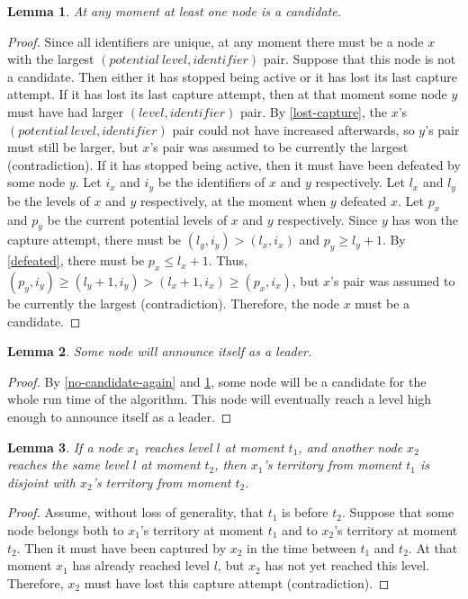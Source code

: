 \documentclass[a4paper,12pt]{article}
\newtheorem{lemma}{Lemma}
\newcommand{\midentifier}{\mathit{identifier}}
\newcommand{\mlevel}{\mathit{level}}
\newcommand{\mpotentiallevel}{\mathit{potential \ level}}
\begin{document}
\begin{lemma}\label{always-one-candidate}
    At any moment at least one node is a candidate.
\end{lemma}
\begin{proof}
    Since all identifiers are unique,
    at any moment there must be a node $x$ with the largest $(\mpotentiallevel, \midentifier)$ pair.
    Suppose that this node is not a candidate.
    Then either it has stopped being active or it has lost its last capture attempt.
    If it has lost its last capture attempt,
    then at that moment some node $y$ must have had larger $(\mlevel, \midentifier)$ pair.
    By \cref{lost-capture}, the $x$'s $(\mpotentiallevel, \midentifier)$ pair
    could not have increased afterwards, so $y$'s pair must still be larger,
    but $x$'s pair was assumed to be currently the largest (contradiction).
    If it has stopped being active, then it must have been defeated by some node $y$.
    Let $i_x$ and $i_y$ be the identifiers of $x$ and $y$ respectively.
    Let $l_x$ and $l_y$ be the levels of $x$ and $y$ respectively, at the moment when $y$ defeated $x$.
    Let $p_x$ and $p_y$ be the current potential levels of $x$ and $y$ respectively.
    Since $y$ has won the capture attempt, there must be $(l_y, i_y) > (l_x, i_x)$ and $p_y \geq l_y + 1$.
    By \cref{defeated}, there must be $p_x \leq l_x + 1$.
    Thus, $(p_y, i_y) \geq (l_y + 1, i_y) > (l_x + 1, i_x) \geq (p_x, i_x)$,
    but $x$'s pair was assumed to be currently the largest (contradiction).
    Therefore, the node $x$ must be a candidate.
\end{proof}

\begin{lemma}\label{min-one-leader}
    Some node will announce itself as a leader.
\end{lemma}
\begin{proof}
    By \cref{no-candidate-again} and \cref{always-one-candidate},
    some node will be a candidate for the whole run time of the algorithm.
    This node will eventually reach a level high enough to announce itself as a leader.
\end{proof}

\begin{lemma}\label{disjoint-territories}
    If a node $x_1$ reaches level $l$ at moment $t_1$,
    and another node $x_2$ reaches the same level $l$ at moment $t_2$,
    then $x_1$'s territory from moment $t_1$ is disjoint with $x_2$'s territory from moment $t_2$.
\end{lemma}
\begin{proof}
    Assume, without loss of generality, that $t_1$ is before $t_2$.
    Suppose that some node belongs both to $x_1$'s territory at moment $t_1$ and to $x_2$'s territory at moment $t_2$.
    Then it must have been captured by $x_2$ in the time between $t_1$ and $t_2$.
    At that moment $x_1$ has already reached level $l$, but $x_2$ has not yet reached this level.
    Therefore, $x_2$ must have lost this capture attempt (contradiction).
\end{proof}
\end{document}
